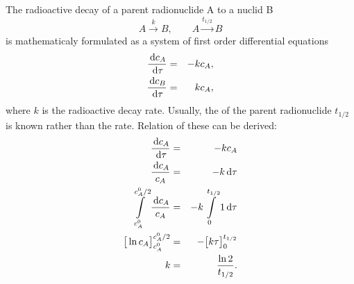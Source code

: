 The radioactive decay of a parent radionuclide A to a nuclid B
%
\[ A\xrightarrow{k} B, \qquad A\xrightarrow{t_{1/2}} B \]
%
is mathematicaly formulated as a system of first order differential equations
%
\begin{eqnarray} \label{eqn:halflife}
  \frac{\d c_A}{\d\tau} &=& -k c_A, \\
  \frac{\d c_B}{\d\tau} &=& k c_A,
\end{eqnarray}
%
where $k$ is the radioactive decay rate. Usually, the  of the parent radionuclide $t_{1/2}$
is known rather than the rate. Relation of these can be derived:
%
\begin{eqnarray*}
    \frac{\,{\rm d} c_A}{\,{\rm d}\tau} &=& -k c_A\\
    \frac{\,{\rm d} c_A}{c_A} &=& -k \,{\rm d}\tau\\
    \int\limits_{c_A^0}^{c_A^0/2}\frac{\,{\rm d} c_A}{c_A} &=& -k\int\limits_{0}^{t_{1/2}} 1\,{\rm d}\tau\\
    \big[ \ln c_A\big]^{c_A^0/2}_{c_A^0} &=& -\big[k\tau\big]^{t_{1/2}}_{0}\\
    k &=& \frac{\ln 2}{t_{1/2}}.
\end{eqnarray*}

